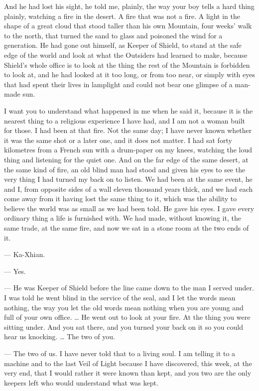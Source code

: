 And he had lost his sight, he told me, plainly, the way your boy tells a hard thing plainly, watching a fire in the desert. A fire that was not a fire. A light in the shape of a great cloud that stood taller than his own Mountain, four weeks' walk to the north, that turned the sand to glass and poisoned the wind for a generation. He had gone out himself, as Keeper of Shield, to stand at the safe edge of the world and look at what the Outsiders had learned to make, because Shield's whole office is to look at the thing the rest of the Mountain is forbidden to look at, and he had looked at it too long, or from too near, or simply with eyes that had spent their lives in lamplight and could not bear one glimpse of a man-made sun.\par

I want you to understand what happened in me when he said it, because it is the nearest thing to a religious experience I have had, and I am not a woman built for those. I had been at that fire. Not the same day; I have never known whether it was the same shot or a later one, and it does not matter. I had sat forty kilometres from a French sun with a drum-paper on my knees, watching the loud thing and listening for the quiet one. And on the far edge of the same desert, at the same kind of fire, an old blind man had stood and given his eyes to see the very thing I had turned my back on to listen. We had been at the same event, he and I, from opposite sides of a wall eleven thousand years thick, and we had each come away from it having lost the same thing to it, which was the ability to believe the world was as small as we had been told. He gave his eyes. I gave every ordinary thing a life is furnished with. We had made, without knowing it, the same trade, at the same fire, and now we sat in a stone room at the two ends of it.\par

\begin{room}

--- Ka-Xhian.

--- Yes.

--- He was Keeper of Shield before the line came down to the man I served under. I was told he went blind in the service of the seal, and I let the words mean nothing, the way you let the old words mean nothing when you are young and full of your own office. \ldots{} He went out to look at your fire. At the thing you were sitting under. And you sat there, and you turned your back on it so you could hear us knocking. \ldots{} The two of you.

--- The two of us. I have never told that to a living soul. I am telling it to a machine and to the last Veil of Light because I have discovered, this week, at the very end, that I would rather it were known than kept, and you two are the only keepers left who would understand what was kept.

\end{room}

